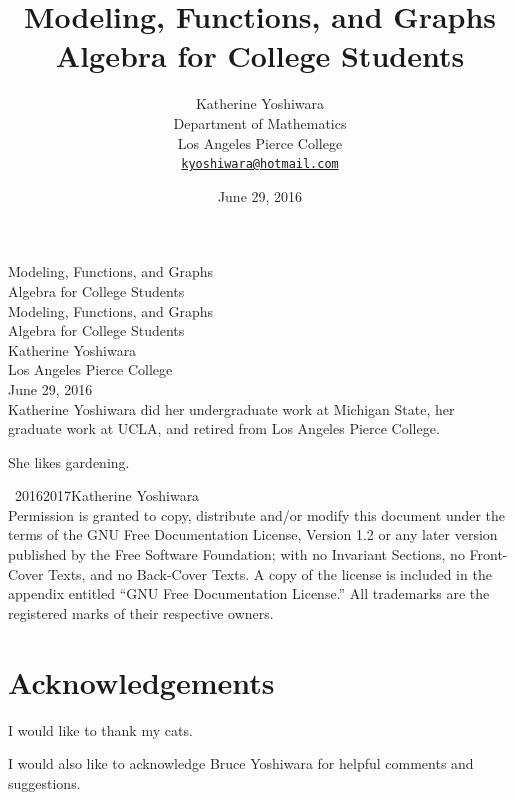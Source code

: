 \documentclass[10pt,]{book}
\title{Modeling, Functions, and Graphs\\
{\large Algebra for College Students}}
\author{Katherine Yoshiwara\\
Department of Mathematics\\
Los Angeles Pierce College\\
\href{mailto:kyoshiwara@hotmail.com}{\nolinkurl{kyoshiwara@hotmail.com}}
}
\date{June 29, 2016}
\theoremstyle{plain}
\theoremstyle{definition}
\theoremstyle{definition}
\theoremstyle{definition}
\theoremstyle{definition}
\theoremstyle{definition}
\numberwithin{equation}{section}
\begin{document}
\frontmatter
\thispagestyle{empty}
{\centering
\vspace*{0.28\textheight}
{\Huge Modeling, Functions, and Graphs}\\[2\baselineskip]
{\LARGE Algebra for College Students}\\
}
\clearpage
\thispagestyle{empty}
\null%
\clearpage
\thispagestyle{empty}
{\centering
\vspace*{0.14\textheight}
{\Huge Modeling, Functions, and Graphs}\\[\baselineskip]
{\LARGE Algebra for College Students}\\[3\baselineskip]
{\Large Katherine Yoshiwara}\\[0.5\baselineskip]
{\Large Los Angeles Pierce College}\\[3\baselineskip]
{\Large June 29, 2016}\\}
\clearpage
\thispagestyle{empty}
\noindent
Katherine Yoshiwara did her undergraduate work at Michigan State, her graduate work at UCLA, and retired from Los Angeles Pierce College.%
\par
She likes gardening.%
\par
{}
\noindent\textcopyright\ 2016\textendash{}2017\quad{}Katherine Yoshiwara\\[0.5\baselineskip]
Permission is granted to copy, distribute and/or modify this document under the terms of the GNU Free Documentation License, Version 1.2 or any later version published by the Free Software Foundation; with no Invariant Sections, no Front-Cover Texts, and no Back-Cover Texts.  A copy of the license is included in the appendix entitled ``GNU Free Documentation License.''  All trademarks\texttrademark{} are the registered\textregistered{} marks of their respective owners.\par
{}
\null\clearpage
\chapter*{Acknowledgements}\label{acknowledgement-1}
I would like to thank my cats.%
\par
I would also like to acknowledge Bruce Yoshiwara for  helpful comments and suggestions. %
\end{document}

